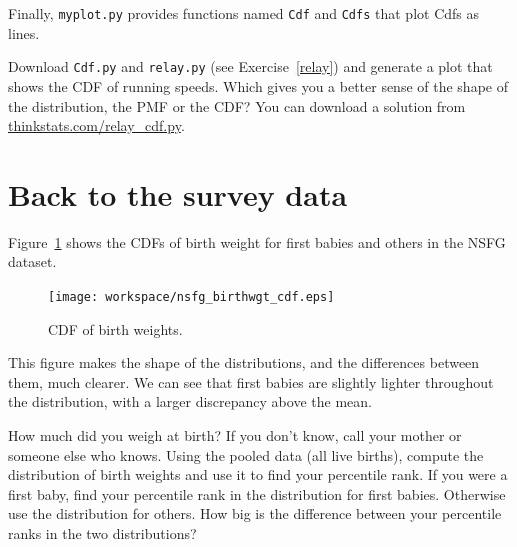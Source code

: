 \documentclass[12pt]{book}
\begin{document}
Finally, {\tt myplot.py} provides functions named {\tt Cdf} and
{\tt Cdfs} that plot Cdfs as lines.

\begin{ex}

Download {\tt Cdf.py} and \verb"relay.py" (see
Exercise~\ref{relay}) and generate a plot that shows the CDF of
running speeds.  Which gives you a better sense of the shape of the
distribution, the PMF or the CDF?  You can download a solution
from \url{thinkstats.com/relay_cdf.py}.


\end{ex}


\section{Back to the survey data}
\label{birth_weights}


Figure~\ref{nsfg_birthwgt_cdf} shows the CDFs of birth weight for
first babies and others in the NSFG dataset.

\begin{figure}
\centerline{\texttt{[image: workspace/nsfg\_birthwgt\_cdf.eps]}}
\caption{CDF of birth weights.}
\label{nsfg_birthwgt_cdf}
\end{figure}

This figure makes the shape of the distributions, and the differences
between them, much clearer.  We can see that first babies are slightly
lighter throughout the distribution, with a larger discrepancy above 
the mean.





\begin{ex}

How much did you weigh at birth?  If you don't know, call your mother
or someone else who knows.  Using the pooled data (all live births),
compute the distribution of birth weights and use it to find your
percentile rank.  If you were a first baby, find your percentile rank
in the distribution for first babies.  Otherwise use the distribution
for others.  How big is the difference between your percentile ranks
in the two distributions?

\end{ex}
\end{document}

